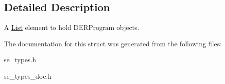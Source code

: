 \subsection{Detailed Description}
A \hyperlink{structList}{List} element to hold D\+E\+R\+Program objects. 

The documentation for this struct was generated from the following files\+:\begin{DoxyCompactItemize}
\item 
se\+\_\+types.\+h\item 
se\+\_\+types\+\_\+doc.\+h\end{DoxyCompactItemize}
